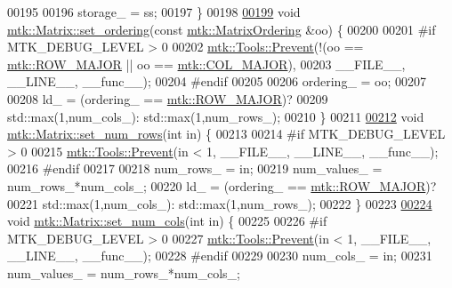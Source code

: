 \begin{DoxyCode}
00195 
00196   storage\_ = ss;
00197 \}
00198 
\hypertarget{mtk__matrix_8cc_source_l00199}{}\hyperlink{classmtk_1_1Matrix_aa390fa8883e58e8f1df9416e5b5b7a83}{00199} \textcolor{keywordtype}{void} \hyperlink{classmtk_1_1Matrix_aa390fa8883e58e8f1df9416e5b5b7a83}{mtk::Matrix::set\_ordering}(\textcolor{keyword}{const} 
      \hyperlink{group__c02-enums_ga622801bd9f912d0f976c3e383f5f581c}{mtk::MatrixOrdering} &oo) \{
00200 
00201 \textcolor{preprocessor}{  #if MTK\_DEBUG\_LEVEL > 0}
00202   \hyperlink{classmtk_1_1Tools_afe5bb096309258e2e72503fd7b41c7e0}{mtk::Tools::Prevent}(!(oo == \hyperlink{namespacemtk_ga622801bd9f912d0f976c3e383f5f581cabc55178ac16eb1ce89b5f3ab915a91f3}{mtk::ROW\_MAJOR} || oo == 
      \hyperlink{namespacemtk_ga622801bd9f912d0f976c3e383f5f581ca7c11989c132253fb76b8f6b1314f7e13}{mtk::COL\_MAJOR}),
00203                       \_\_FILE\_\_, \_\_LINE\_\_, \_\_func\_\_);
00204 \textcolor{preprocessor}{  #endif}
00205 
00206   ordering\_ = oo;
00207 
00208   ld\_ = (ordering\_ == \hyperlink{namespacemtk_ga622801bd9f912d0f976c3e383f5f581cabc55178ac16eb1ce89b5f3ab915a91f3}{mtk::ROW\_MAJOR})?
00209     std::max(1,num\_cols\_): std::max(1,num\_rows\_);
00210 \}
00211 
\hypertarget{mtk__matrix_8cc_source_l00212}{}\hyperlink{classmtk_1_1Matrix_a242fedf2da10a3e5c14f63c2bc60beae}{00212} \textcolor{keywordtype}{void} \hyperlink{classmtk_1_1Matrix_a242fedf2da10a3e5c14f63c2bc60beae}{mtk::Matrix::set\_num\_rows}(\textcolor{keywordtype}{int} in) \{
00213 
00214 \textcolor{preprocessor}{  #if MTK\_DEBUG\_LEVEL > 0}
00215   \hyperlink{classmtk_1_1Tools_afe5bb096309258e2e72503fd7b41c7e0}{mtk::Tools::Prevent}(in < 1, \_\_FILE\_\_, \_\_LINE\_\_, \_\_func\_\_);
00216 \textcolor{preprocessor}{  #endif}
00217 
00218   num\_rows\_ = in;
00219   num\_values\_ = num\_rows\_*num\_cols\_;
00220   ld\_ = (ordering\_ == \hyperlink{namespacemtk_ga622801bd9f912d0f976c3e383f5f581cabc55178ac16eb1ce89b5f3ab915a91f3}{mtk::ROW\_MAJOR})?
00221     std::max(1,num\_cols\_): std::max(1,num\_rows\_);
00222 \}
00223 
\hypertarget{mtk__matrix_8cc_source_l00224}{}\hyperlink{classmtk_1_1Matrix_a312883d34f2e0daf5db7432ee2c4ed51}{00224} \textcolor{keywordtype}{void} \hyperlink{classmtk_1_1Matrix_a312883d34f2e0daf5db7432ee2c4ed51}{mtk::Matrix::set\_num\_cols}(\textcolor{keywordtype}{int} in) \{
00225 
00226 \textcolor{preprocessor}{  #if MTK\_DEBUG\_LEVEL > 0}
00227   \hyperlink{classmtk_1_1Tools_afe5bb096309258e2e72503fd7b41c7e0}{mtk::Tools::Prevent}(in < 1, \_\_FILE\_\_, \_\_LINE\_\_, \_\_func\_\_);
00228 \textcolor{preprocessor}{  #endif}
00229 
00230   num\_cols\_ = in;
00231   num\_values\_ = num\_rows\_*num\_cols\_;

\end{DoxyCode}
